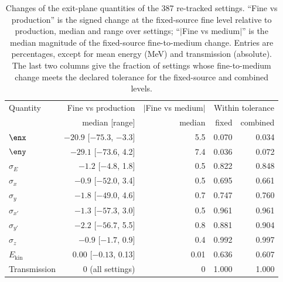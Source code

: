 \begin{table}[htbp]
\centering
\caption{Changes of the exit-plane quantities of the 387 re-tracked settings. ``Fine vs
production'' is the signed change at the fixed-source fine level relative to production, median
and range over settings; ``$|$Fine vs medium$|$'' is the median magnitude of the fixed-source
fine-to-medium change. Entries are percentages, except for mean energy (\si{\mega\electronvolt})
and transmission (absolute). The last two columns give the fraction of settings whose fine-to-medium
change meets the declared tolerance for the fixed-source and combined levels.}
\label{tab:retracking_values}
\small
\begin{tabular}{lrrrr}
\toprule
Quantity & Fine vs production & $|$Fine vs medium$|$ & \multicolumn{2}{c}{Within tolerance} \\
 & median [range] & median & fixed & combined \\
\midrule
$\enx$ & $-20.9$ [$-75.3$, $-3.3$] & 5.5 & 0.070 & 0.034 \\
$\eny$ & $-29.1$ [$-73.6$, 4.2] & 7.4 & 0.036 & 0.072 \\
$\sigma_E$ & $-1.2$ [$-4.8$, 1.8] & 0.5 & 0.822 & 0.848 \\
$\sigma_x$ & $-0.9$ [$-52.0$, 3.4] & 0.5 & 0.695 & 0.661 \\
$\sigma_y$ & $-1.8$ [$-49.0$, 4.6] & 0.7 & 0.747 & 0.760 \\
$\sigma_{x'}$ & $-1.3$ [$-57.3$, 3.0] & 0.5 & 0.961 & 0.961 \\
$\sigma_{y'}$ & $-2.2$ [$-56.7$, 5.5] & 0.8 & 0.881 & 0.904 \\
$\sigma_z$ & $-0.9$ [$-1.7$, 0.9] & 0.4 & 0.992 & 0.997 \\
$E_\mathrm{kin}$ & 0.00 [$-0.13$, 0.13] & 0.01 & 0.636 & 0.607 \\
Transmission & 0 (all settings) & 0 & 1.000 & 1.000 \\
\bottomrule
\end{tabular}
\end{table}
